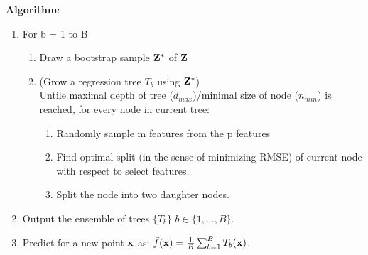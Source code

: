 \documentclass[11pt]{article}
\theoremstyle{definition}
\begin{document}
\textbf{Algorithm}:
\begin{enumerate}
\item For b = 1 to B
	\begin{enumerate}
	\item Draw a bootstrap sample ${\bf Z}^*$ of ${\bf Z}$
	\item (Grow a regression tree $T_b$ using ${\bf Z}^*$)\\
	Untile maximal depth of tree ($d_{max}$)/minimal size of node ($n_{min}$) is reached, for every node in current tree:
	\begin{enumerate}
		\item Randomly sample m features from the p features
		\item Find optimal split (in the sense of minimizing RMSE) of current node with respect to select features.
		\item Split the node into two daughter nodes.
	\end{enumerate}
	\end{enumerate}
\item Output the ensemble of trees $\{T_b\}$ $b \in \{1, ..., B\}$.
\item Predict for a new point ${\bf x}$ as: 
$\hat{f}({\bf x}) = \frac{1}{B} \sum_{b=1}^B T_b({\bf x})$.
\end{enumerate}
\end{document}
